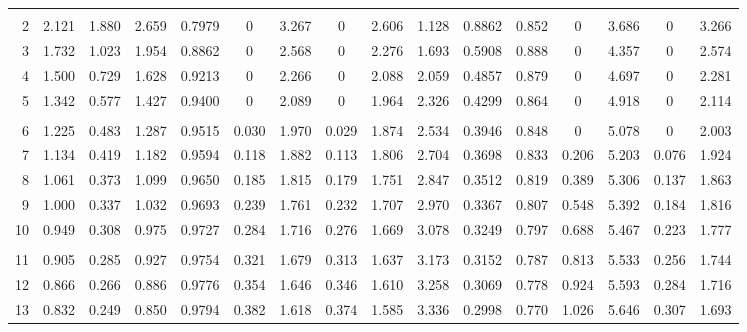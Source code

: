 \documentclass{article}
\begin{document}
\begin{landscape}
\begin{center}
\begin{tabular}{|r|c|c|c|c|c|c|c|c|c|c|c|c|c|c|c|}
       &       &        &       &       &       &       &       &
       &       &        &       &       &       &       &       \\
     2 & 2.121 & 1.880 & 2.659 & 0.7979 &   0   & 3.267 &   0   & 2.606
       & 1.128 & 0.8862 & 0.852 &   0   & 3.686 &   0   & 3.266 \\
     3 & 1.732 & 1.023 & 1.954 & 0.8862 &   0   & 2.568 &   0   & 2.276
       & 1.693 & 0.5908 & 0.888 &   0   & 4.357 &   0   & 2.574 \\
     4 & 1.500 & 0.729 & 1.628 & 0.9213 &   0   & 2.266 &   0   & 2.088
       & 2.059 & 0.4857 & 0.879 &   0   & 4.697 &   0   & 2.281 \\
     5 & 1.342 & 0.577 & 1.427 & 0.9400 &   0   & 2.089 &   0   & 1.964
       & 2.326 & 0.4299 & 0.864 &   0   & 4.918 &   0   & 2.114 \\
       &       &        &       &       &       &       &       &
       &       &        &       &       &       &       &       \\
     6 & 1.225 & 0.483 & 1.287 & 0.9515 & 0.030 & 1.970 & 0.029 & 1.874
       & 2.534 & 0.3946 & 0.848 &   0   & 5.078 &   0   & 2.003 \\
     7 & 1.134 & 0.419 & 1.182 & 0.9594 & 0.118 & 1.882 & 0.113 & 1.806
       & 2.704 & 0.3698 & 0.833 & 0.206 & 5.203 & 0.076 & 1.924 \\
     8 & 1.061 & 0.373 & 1.099 & 0.9650 & 0.185 & 1.815 & 0.179 & 1.751
       & 2.847 & 0.3512 & 0.819 & 0.389 & 5.306 & 0.137 & 1.863 \\
     9 & 1.000 & 0.337 & 1.032 & 0.9693 & 0.239 & 1.761 & 0.232 & 1.707
       & 2.970 & 0.3367 & 0.807 & 0.548 & 5.392 & 0.184 & 1.816 \\
    10 & 0.949 & 0.308 & 0.975 & 0.9727 & 0.284 & 1.716 & 0.276 & 1.669
       & 3.078 & 0.3249 & 0.797 & 0.688 & 5.467 & 0.223 & 1.777 \\
       &       &        &       &       &       &       &       &
       &       &        &       &       &       &       &       \\
    11 & 0.905 & 0.285 & 0.927 & 0.9754 & 0.321 & 1.679 & 0.313 & 1.637
       & 3.173 & 0.3152 & 0.787 & 0.813 & 5.533 & 0.256 & 1.744 \\
    12 & 0.866 & 0.266 & 0.886 & 0.9776 & 0.354 & 1.646 & 0.346 & 1.610
       & 3.258 & 0.3069 & 0.778 & 0.924 & 5.593 & 0.284 & 1.716 \\
    13 & 0.832 & 0.249 & 0.850 & 0.9794 & 0.382 & 1.618 & 0.374 & 1.585
       & 3.336 & 0.2998 & 0.770 & 1.026 & 5.646 & 0.307 & 1.693 \\

\end{tabular}
\end{center}
\end{landscape}
\end{document}
